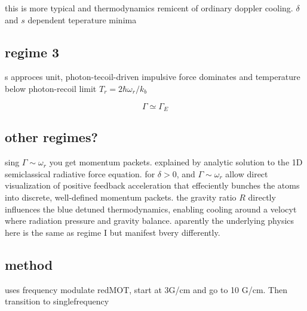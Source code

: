 \documentclass[../../main.tex]{subfiles} %
\begin{document}
this is more typical and thermodynamics remicent of ordinary doppler cooling. $\delta$ and $s$ dependent teperature minima

\subsection{regime 3}
s approces unit, photon-tecoil-driven impulsive force dominates and temperature below photon-recoil limit $T_r=2\hbar\omega_r/k_b$

$$\Gamma\simeq\Gamma_E$$

\subsection{other regimes?}
sing $\Gamma\sim \omega_r$ you get momentum packets. explained by analytic solution to the 1D semiclassical radiative force equation. for $\delta>0$, and $\Gamma\sim \omega_r$  allow direct visualization of positive feedback acceleration that effeciently bunches the atoms into discrete, well-defined momentum packets. the gravity ratio $R$ directly influences the blue detuned thermodynamics, enabling cooling around a velocyt where radiation pressure and gravity balance. aparently the underlying physics here is the same as regime I but manifest bvery differently.

\subsection{method}
uses frequency modulate redMOT, start at 3G/cm and go to 10 G/cm. Then transition to singlefrequency 
\end{document}
